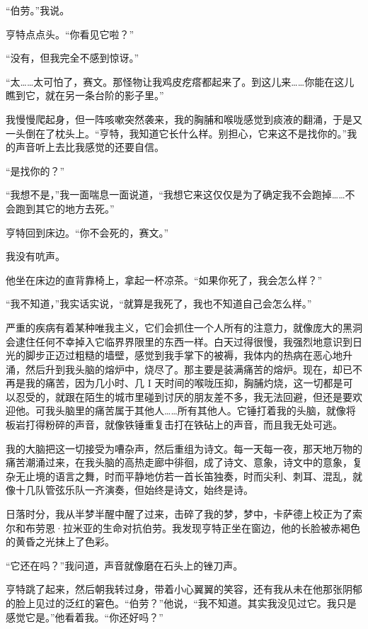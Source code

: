 \documentclass[AutoFakeBold=true]{book}
\begin{document}
``伯劳。''我说。

亨特点点头。``你看见它啦？''

``没有，但我完全不感到惊讶。''

``太……太可怕了，赛文。那怪物让我鸡皮疙瘩都起来了。到这儿来……你能在这儿瞧到它，就在另一条台阶的影子里。''

我慢慢爬起身，但一阵咳嗽突然袭来，我的胸脯和喉咙感觉到痰液的翻涌，于是又一头倒在了枕头上。``亨特，我知道它长什么样。别担心，它来这不是找你的。''我的声音听上去比我感觉的还要自信。

``是找你的？''

``我想不是，''我一面喘息一面说道，``我想它来这仅仅是为了确定我不会跑掉……不会跑到其它的地方去死。''

亨特回到床边。``你不会死的，赛文。''

我没有吭声。

他坐在床边的直背靠椅上，拿起一杯凉茶。``如果你死了，我会怎么样？''

``我不知道，''我实话实说，``就算是我死了，我也不知道自己会怎么样。''

\vspace*{1em}

严重的疾病有着某种唯我主义，它们会抓住一个人所有的注意力，就像庞大的黑洞会逮住任何不幸掉入它临界界限里的东西一样。白天过得很慢，我强烈地意识到日光的脚步正迈过粗糙的墙壁，感觉到我手掌下的被褥，我体内的热病在恶心地升涌，然后升到我头脑的熔炉中，烧尽了。那主要是装满痛苦的熔炉。现在，却已不再是我的痛苦，因为几小时、几 I 天时间的喉咙压抑，胸脯灼烧，这一切都是可以忍受的，就跟在陌生的城市里碰到讨厌的朋友差不多，我无法回避，但还是要欢迎他。可我头脑里的痛苦属于其他人……所有其他人。它锤打着我的头脑，就像将板岩打得粉碎的声音，就像铁锤重复击打在铁砧上的声音，而且我无处可逃。

我的大脑把这一切接受为嘈杂声，然后重组为诗文。每一天每一夜，那天地万物的痛苦潮涌过来，在我头脑的高热走廊中徘徊，成了诗文、意象，诗文中的意象，复杂无止境的语言之舞，时而平静地仿若一首长笛独奏，时而尖利、刺耳、混乱，就像十几队管弦乐队一齐演奏，但始终是诗文，始终是诗。

日落时分，我从半梦半醒中醒了过来，击碎了我的梦，梦中，卡萨德上校正为了索尔和布劳恩·拉米亚的生命对抗伯劳。我发现亨特正坐在窗边，他的长脸被赤褐色的黄昏之光抹上了色彩。

``它还在吗？''我问道，声音就像磨在石头上的锉刀声。

亨特跳了起来，然后朝我转过身，带着小心翼翼的笑容，还有我从未在他那张阴郁的脸上见过的泛红的窘色。``伯劳？''他说，``我不知道。其实我没见过它。我只是感觉它是。''他看着我。``你还好吗？''
\end{document}
